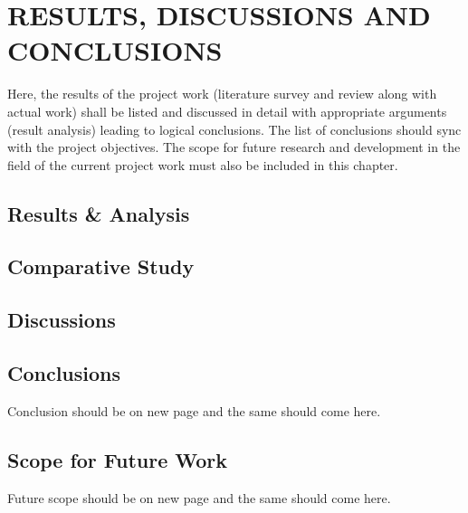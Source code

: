 \chapter{RESULTS, DISCUSSIONS AND CONCLUSIONS} %
\label{ChapterResults} %

Here, the results of the project work (literature survey and review along with actual work) shall be listed and discussed in detail with appropriate arguments (result analysis) leading to logical conclusions. The list of conclusions should sync with the project objectives. The scope for future research and development in the field of the current project work must also be included in this chapter. 

\section{Results \& Analysis}

\section{Comparative Study}

\section{Discussions}


\section{Conclusions}
Conclusion should be on new page and the same should come here.


\section{Scope for Future Work}
Future scope should be on new page and the same should come here.



	
	






